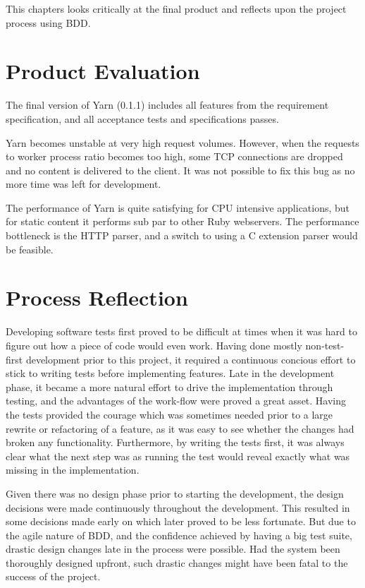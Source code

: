 This chapters looks critically at the final product and reflects upon the
project process using BDD.

\section{Product Evaluation}
The final version of Yarn (0.1.1) includes all features from the requirement
specification, and all acceptance tests and specifications passes. 

Yarn becomes unstable at very high request volumes. However, when the requests to worker
process ratio becomes too high, some TCP connections are dropped and no
content is delivered to the client.  It was not possible to fix this bug as no
more time was left for development.

The performance of Yarn is quite satisfying for CPU intensive applications,
but for static content it performs sub par to other Ruby webservers. The
performance bottleneck is the HTTP parser, and a switch to using a C extension
parser would be feasible.

\section{Process Reflection}
Developing software tests first proved to be difficult at times when it was
hard to figure out how a piece of code would even work. Having done mostly
non-test-first development prior to this project, it required a continuous
concious effort to stick to writing tests before implementing features. Late
in the development phase, it became a more natural effort to drive the
implementation through testing, and the advantages of the work-flow were proved
a great asset. Having the tests provided the courage which was sometimes
needed prior to a large rewrite or refactoring of a feature, as it was 
easy to see whether the changes had broken any functionality. Furthermore, by writing
the tests first, it was always clear what the next step was as running the
test would reveal exactly what was missing in the implementation.

Given there was no design phase prior to starting the development, the design
decisions were made continuously throughout the development. This resulted in
some decisions made early on which later proved to be less fortunate. But due
to the agile nature of BDD, and the confidence achieved by having a big test
suite, drastic design changes late in the process were possible. Had the
system been thoroughly designed upfront, such drastic changes might have been
fatal to the success of the project.
